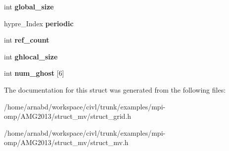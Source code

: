 \begin{DoxyCompactItemize}
\item 
\hypertarget{structhypre__StructGrid__struct_acf5acb5fc78a041bb112eb33b6252461}{}int {\bfseries global\+\_\+size}\label{structhypre__StructGrid__struct_acf5acb5fc78a041bb112eb33b6252461}

\item 
\hypertarget{structhypre__StructGrid__struct_a1c5dfb31fa86a625144c911887a919b0}{}hypre\+\_\+\+Index {\bfseries periodic}\label{structhypre__StructGrid__struct_a1c5dfb31fa86a625144c911887a919b0}

\item 
\hypertarget{structhypre__StructGrid__struct_ae26a546367302953ed8663870309146f}{}int {\bfseries ref\+\_\+count}\label{structhypre__StructGrid__struct_ae26a546367302953ed8663870309146f}

\item 
\hypertarget{structhypre__StructGrid__struct_a623d9add631ec391bc2698281ed5b6f3}{}int {\bfseries ghlocal\+\_\+size}\label{structhypre__StructGrid__struct_a623d9add631ec391bc2698281ed5b6f3}

\item 
\hypertarget{structhypre__StructGrid__struct_a893c239c5a45f637f41dcfd406b24e66}{}int {\bfseries num\+\_\+ghost} \mbox{[}6\mbox{]}\label{structhypre__StructGrid__struct_a893c239c5a45f637f41dcfd406b24e66}

\end{DoxyCompactItemize}


The documentation for this struct was generated from the following files\+:\begin{DoxyCompactItemize}
\item 
/home/arnabd/workspace/civl/trunk/examples/mpi-\/omp/\+A\+M\+G2013/struct\+\_\+mv/struct\+\_\+grid.\+h\item 
/home/arnabd/workspace/civl/trunk/examples/mpi-\/omp/\+A\+M\+G2013/struct\+\_\+mv/struct\+\_\+mv.\+h\end{DoxyCompactItemize}
